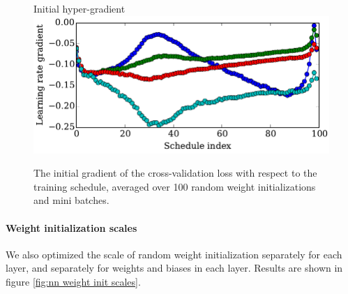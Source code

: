 \documentclass{article}
\begin{document}
\begin{figure}[h!]
\vskip 0.2in
\begin{center}
Initial hyper-gradient\\
\includegraphics[width=\columnwidth]{../experiments/Feb_2_plot_metagradient/1/schedule_gradients_small.pdf}
\caption{The initial gradient of the cross-validation loss with respect to the training schedule, averaged over 100 random weight initializations and mini batches.}
\label{fig:optimal schedule}
\end{center}
\vskip -0.2in
\end{figure} 

\paragraph{Weight initialization scales}
We also optimized the scale of random weight initialization separately for each layer, and separately for weights and biases in each layer.
Results are shown in figure \ref{fig:nn weight init scales}.
\end{document}
